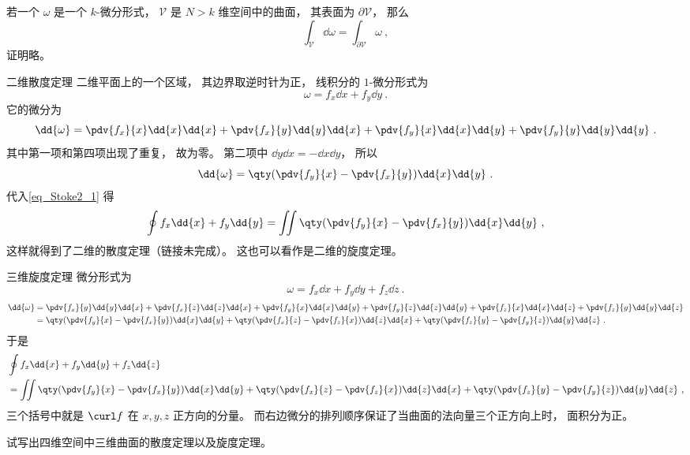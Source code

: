 

若一个 $\omega$ 是一个 $k$-微分形式， $\mathcal V$ 是 $N> k$ 维空间中的曲面， 其表面为 $\partial \mathcal V$， 那么
\begin{equation}\label{eq_Stoke2_1}
\int_{\mathcal V} \dd{\omega} = \int_{\partial \mathcal V} \omega~,
\end{equation}
证明略。

\begin{example}{二维散度定理}
二维平面上的一个区域， 其边界取逆时针为正， 线积分的 $1$-微分形式为
\begin{equation}
\omega = f_x \dd{x} + f_y \dd{y}~.
\end{equation}
它的微分为
\begin{equation}
\dd{\omega} = \pdv{f_x}{x}\dd{x}\dd{x} + \pdv{f_x}{y}\dd{y}\dd{x}
+ \pdv{f_y}{x}\dd{x}\dd{y} + \pdv{f_y}{y}\dd{y}\dd{y}~.
\end{equation}
其中第一项和第四项出现了重复， 故为零。 第二项中 $\dd{y}\dd{x} = -\dd{x}\dd{y}$， 所以
\begin{equation}
\dd{\omega} = \qty(\pdv{f_y}{x}-\pdv{f_x}{y})\dd{x}\dd{y}~.
\end{equation}
代入\autoref{eq_Stoke2_1} 得
\begin{equation}
\oint f_x \dd{x} + f_y \dd{y} = \iint \qty(\pdv{f_y}{x}-\pdv{f_x}{y})\dd{x}\dd{y}~,
\end{equation}
这样就得到了二维的散度定理（链接未完成）。 这也可以看作是二维的旋度定理。
\end{example}

\begin{example}{三维旋度定理}
微分形式为
\begin{equation}
\omega = f_x \dd{x} + f_y \dd{y} + f_z \dd{z}~.
\end{equation}
\begin{equation}
\begin{aligned}
\dd{\omega} &= \pdv{f_x}{y}\dd{y}\dd{x} + \pdv{f_x}{z}\dd{z}\dd{x}
+ \pdv{f_y}{x}\dd{x}\dd{y} + \pdv{f_y}{z}\dd{z}\dd{y}
+ \pdv{f_z}{x}\dd{x}\dd{z} + \pdv{f_z}{y}\dd{y}\dd{z}\\
&= \qty(\pdv{f_y}{x}-\pdv{f_x}{y})\dd{x}\dd{y}
+ \qty(\pdv{f_x}{z}- \pdv{f_z}{x})\dd{z}\dd{x}
+ \qty(\pdv{f_z}{y}-\pdv{f_y}{z})\dd{y}\dd{z}~.
\end{aligned}
\end{equation}
于是
\begin{equation}
\begin{aligned}
&\oint f_x \dd{x} + f_y \dd{y} + f_z \dd{z}\\
&= \iint \qty(\pdv{f_y}{x}-\pdv{f_x}{y})\dd{x}\dd{y}
+ \qty(\pdv{f_x}{z}- \pdv{f_z}{x})\dd{z}\dd{x}
+ \qty(\pdv{f_z}{y}-\pdv{f_y}{z})\dd{y}\dd{z}~,
\end{aligned}
\end{equation}
三个括号中就是 $\curl f$ 在 $x,y,z$ 正方向的分量。 而右边微分的排列顺序保证了当曲面的法向量三个正方向上时， 面积分为正。
\end{example}

\begin{exercise}{}
试写出四维空间中三维曲面的散度定理以及旋度定理。
\end{exercise}

